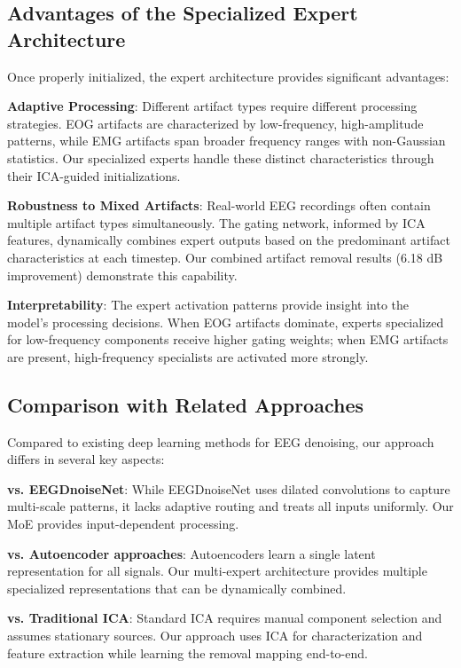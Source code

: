 \documentclass[journal]{IEEEtran}
\begin{document}
\subsection{Advantages of the Specialized Expert Architecture}

Once properly initialized, the expert architecture provides significant advantages:

\textbf{Adaptive Processing}: Different artifact types require different processing strategies. EOG artifacts are characterized by low-frequency, high-amplitude patterns, while EMG artifacts span broader frequency ranges with non-Gaussian statistics. Our specialized experts handle these distinct characteristics through their ICA-guided initializations.

\textbf{Robustness to Mixed Artifacts}: Real-world EEG recordings often contain multiple artifact types simultaneously. The gating network, informed by ICA features, dynamically combines expert outputs based on the predominant artifact characteristics at each timestep. Our combined artifact removal results (6.18 dB improvement) demonstrate this capability.

\textbf{Interpretability}: The expert activation patterns provide insight into the model's processing decisions. When EOG artifacts dominate, experts specialized for low-frequency components receive higher gating weights; when EMG artifacts are present, high-frequency specialists are activated more strongly.

\subsection{Comparison with Related Approaches}

Compared to existing deep learning methods for EEG denoising, our approach differs in several key aspects:

\textbf{vs. EEGDnoiseNet}: While EEGDnoiseNet uses dilated convolutions to capture multi-scale patterns, it lacks adaptive routing and treats all inputs uniformly. Our MoE provides input-dependent processing.

\textbf{vs. Autoencoder approaches}: Autoencoders learn a single latent representation for all signals. Our multi-expert architecture provides multiple specialized representations that can be dynamically combined.

\textbf{vs. Traditional ICA}: Standard ICA requires manual component selection and assumes stationary sources. Our approach uses ICA for characterization and feature extraction while learning the removal mapping end-to-end.
\end{document}
